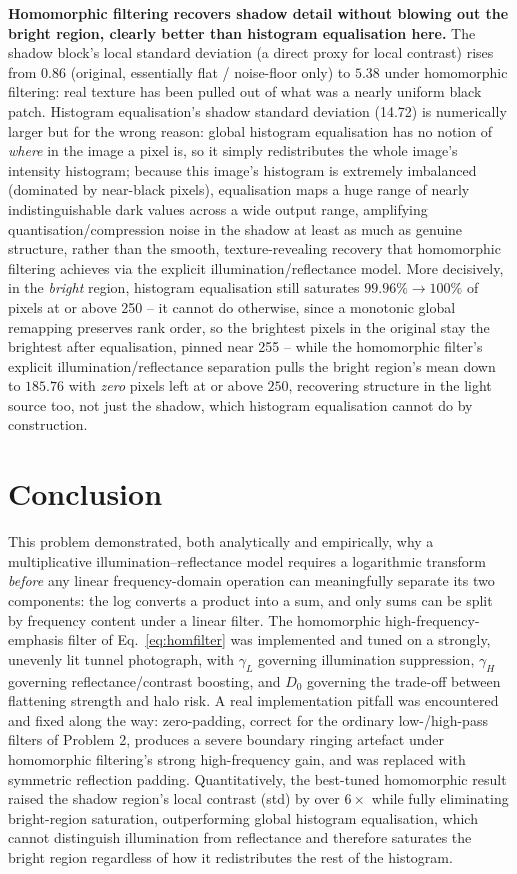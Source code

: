\documentclass[11pt]{article}
\begin{document}
\textbf{Homomorphic filtering recovers shadow detail without blowing out the bright
region, clearly better than histogram equalisation here.} The shadow block's local
standard deviation (a direct proxy for local contrast) rises from $0.86$ (original,
essentially flat / noise-floor only) to $5.38$ under homomorphic filtering: real texture
has been pulled out of what was a nearly uniform black patch. Histogram equalisation's
shadow standard deviation (14.72) is numerically larger but for the wrong reason: global
histogram equalisation has no notion of \emph{where} in the image a pixel is, so it
simply redistributes the whole image's intensity histogram; because this image's
histogram is extremely imbalanced (dominated by near-black pixels), equalisation maps a
huge range of nearly indistinguishable dark values across a wide output range,
amplifying quantisation/compression noise in the shadow at least as much as genuine
structure, rather than the smooth, texture-revealing recovery that homomorphic filtering
achieves via the explicit illumination/reflectance model. More decisively, in the
\emph{bright} region, histogram equalisation still saturates $99.96\%\to100\%$ of pixels
at or above 250 -- it cannot do otherwise, since a monotonic global remapping preserves
rank order, so the brightest pixels in the original stay the brightest after equalisation,
pinned near 255 -- while the homomorphic filter's explicit illumination/reflectance
separation pulls the bright region's mean down to $185.76$ with \emph{zero} pixels left
at or above $250$, recovering structure in the light source too, not just the shadow,
which histogram equalisation cannot do by construction.

\section{Conclusion}

This problem demonstrated, both analytically and empirically, why a multiplicative
illumination--reflectance model requires a logarithmic transform \emph{before} any
linear frequency-domain operation can meaningfully separate its two components: the
log converts a product into a sum, and only sums can be split by frequency content
under a linear filter. The homomorphic high-frequency-emphasis filter of
Eq.~\eqref{eq:homfilter} was implemented and tuned on a strongly, unevenly lit tunnel
photograph, with $\gamma_L$ governing illumination suppression, $\gamma_H$ governing
reflectance/contrast boosting, and $D_0$ governing the trade-off between flattening
strength and halo risk. A real implementation pitfall was encountered and fixed along
the way: zero-padding, correct for the ordinary low-/high-pass filters of Problem 2,
produces a severe boundary ringing artefact under homomorphic filtering's strong
high-frequency gain, and was replaced with symmetric reflection padding. Quantitatively,
the best-tuned homomorphic result raised the shadow region's local contrast (std) by
over $6\times$ while fully eliminating bright-region saturation, outperforming global
histogram equalisation, which cannot distinguish illumination from reflectance and
therefore saturates the bright region regardless of how it redistributes the rest of
the histogram.
\end{document}
